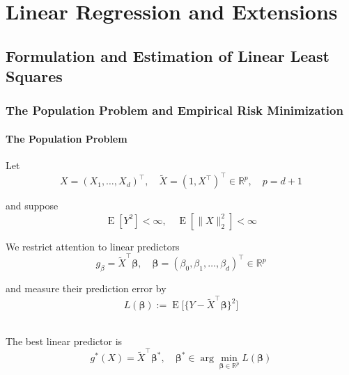 \providecommand{\E}{\operatorname{E}}
\providecommand{\Var}{\operatorname{Var}}
\providecommand{\fhat}{\hat{f}}
\providecommand{\data}{\mathcal{D}}
\providecommand{\Bias}{\operatorname{Bias}}
\providecommand{\Cov}{\operatorname{Cov}}
\providecommand{\thetahat}{\hat\theta}
\providecommand{\betahat}{\hat{\bm\beta}}


\chapter{Linear Regression and Extensions}
\label{ch:topic2}

\section{Formulation and Estimation of Linear Least Squares}

\subsection{The Population Problem and Empirical Risk Minimization}

\subsubsection{The Population Problem}
Let
\begin{equation*}
    X=(X_1,\dots,X_d)^\top, \quad \widetilde{X}=(1,X^\top)^\top \in \mathbb{R}^p, \quad p=d+1
\end{equation*}

and suppose
\begin{equation*}
    \E[Y^2] < \infty, \quad \E[\lVert X \rVert_2^2]<\infty
\end{equation*}

We restrict attention to linear predictors
\begin{equation*}
    g_\beta=\widetilde{X}^\top\bm\beta, \quad \bm{\beta}=(\beta_0,\beta_1,\dots,\beta_d)^\top \in \mathbb{R}^p
\end{equation*}

and measure their prediction error by
\begin{equation*}
    L(\bm\beta):=\E \Big[\{Y-\widetilde{X}^\top\bm\beta\}^2\Big]
\end{equation*}

\begin{definition} \leavevmode \\
    The best linear predictor is
    \begin{equation*}
        g^*(X)=\widetilde{X}^\top\bm\beta^*, \quad \bm\beta^*\in \arg \min_{\bm\beta\in\mathbb{R}^p}L(\bm\beta)
    \end{equation*}
\end{definition}


